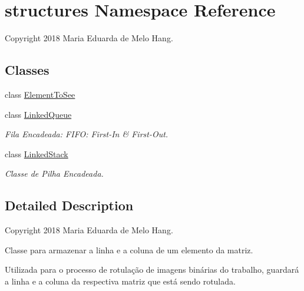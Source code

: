 \hypertarget{namespacestructures}{}\section{structures Namespace Reference}
\label{namespacestructures}


Copyright 2018 Maria Eduarda de Melo Hang.  


\subsection*{Classes}
\begin{DoxyCompactItemize}
\item 
class \hyperlink{classstructures_1_1ElementToSee}{Element\+To\+See}
\item 
class \hyperlink{classstructures_1_1LinkedQueue}{Linked\+Queue}
\begin{DoxyCompactList}\small\item\em Fila Encadeada\+: F\+I\+FO\+: First-\/\+In \& First-\/\+Out. \end{DoxyCompactList}\item 
class \hyperlink{classstructures_1_1LinkedStack}{Linked\+Stack}
\begin{DoxyCompactList}\small\item\em Classe de Pilha Encadeada. \end{DoxyCompactList}\end{DoxyCompactItemize}


\subsection{Detailed Description}
Copyright 2018 Maria Eduarda de Melo Hang. 

Classe para armazenar a linha e a coluna de um elemento da matriz.

Utilizada para o processo de rotulação de imagens binárias do trabalho, guardará a linha e a coluna da respectiva matriz que está sendo rotulada. 